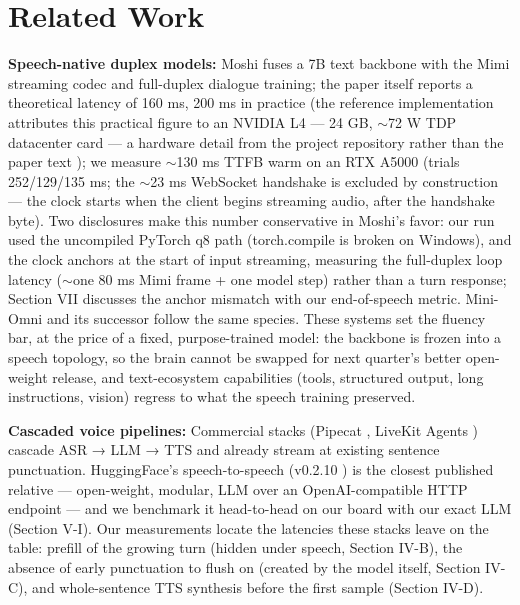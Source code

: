 \documentclass[journal]{IEEEtran}
\begin{document}
\section{Related Work}

\textbf{Speech-native duplex models:} Moshi \cite{defossez2024moshi} fuses a 7B text backbone with the Mimi streaming codec and full-duplex dialogue training; the paper itself reports a theoretical latency of 160 ms, 200 ms in practice \cite{defossez2024moshi} (the reference implementation attributes this practical figure to an NVIDIA L4 — 24 GB, $\sim$72 W TDP datacenter card — a hardware detail from the project repository rather than the paper text \cite{kyutai2024moshirepo,nvidial4}); we measure $\sim$130 ms TTFB warm on an RTX A5000 (trials 252/129/135 ms; the $\sim$23 ms WebSocket handshake is excluded by construction — the clock starts when the client begins streaming audio, after the handshake byte). Two disclosures make this number conservative in Moshi's favor: our run used the uncompiled PyTorch q8 path (torch.compile is broken on Windows), and the clock anchors at the start of input streaming, measuring the full-duplex loop latency ($\sim$one 80 ms Mimi frame + one model step) rather than a turn response; Section VII discusses the anchor mismatch with our end-of-speech metric. Mini-Omni and its successor \cite{xie2024miniomni,xie2024miniomni2} follow the same species. These systems set the fluency bar, at the price of a fixed, purpose-trained model: the backbone is frozen into a speech topology, so the brain cannot be swapped for next quarter's better open-weight release, and text-ecosystem capabilities (tools, structured output, long instructions, vision) regress to what the speech training preserved.

\textbf{Cascaded voice pipelines:} Commercial stacks (Pipecat \cite{pipecat}, LiveKit Agents \cite{livekitagents}) cascade ASR → LLM → TTS and already stream at existing sentence punctuation. HuggingFace's speech-to-speech (v0.2.10 \cite{hfspeech2speech}) is the closest published relative — open-weight, modular, LLM over an OpenAI-compatible HTTP endpoint — and we benchmark it head-to-head on our board with our exact LLM (Section V-I). Our measurements locate the latencies these stacks leave on the table: prefill of the growing turn (hidden under speech, Section IV-B), the absence of early punctuation to flush on (created by the model itself, Section IV-C), and whole-sentence TTS synthesis before the first sample (Section IV-D).
\end{document}
